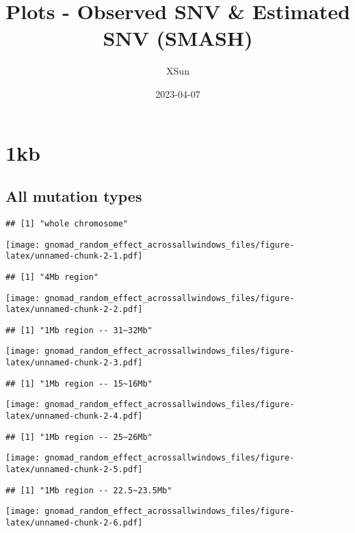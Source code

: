 \documentclass[
]{article}
\title{Plots - Observed SNV \& Estimated SNV (SMASH)}
\author{XSun}
\date{2023-04-07}
\begin{document}
\maketitle

\hypertarget{kb}{%
\section{1kb}\label{kb}}

\hypertarget{all-mutation-types}{%
\subsection{All mutation types}\label{all-mutation-types}}

\begin{verbatim}
## [1] "whole chromosome"
\end{verbatim}

\texttt{[image: gnomad\_random\_effect\_acrossallwindows\_files/figure-latex/unnamed-chunk-2-1.pdf]}

\begin{verbatim}
## [1] "4Mb region"
\end{verbatim}

\texttt{[image: gnomad\_random\_effect\_acrossallwindows\_files/figure-latex/unnamed-chunk-2-2.pdf]}

\begin{verbatim}
## [1] "1Mb region -- 31~32Mb"
\end{verbatim}

\texttt{[image: gnomad\_random\_effect\_acrossallwindows\_files/figure-latex/unnamed-chunk-2-3.pdf]}

\begin{verbatim}
## [1] "1Mb region -- 15~16Mb"
\end{verbatim}

\texttt{[image: gnomad\_random\_effect\_acrossallwindows\_files/figure-latex/unnamed-chunk-2-4.pdf]}

\begin{verbatim}
## [1] "1Mb region -- 25~26Mb"
\end{verbatim}

\texttt{[image: gnomad\_random\_effect\_acrossallwindows\_files/figure-latex/unnamed-chunk-2-5.pdf]}

\begin{verbatim}
## [1] "1Mb region -- 22.5~23.5Mb"
\end{verbatim}

\texttt{[image: gnomad\_random\_effect\_acrossallwindows\_files/figure-latex/unnamed-chunk-2-6.pdf]}
\end{document}

